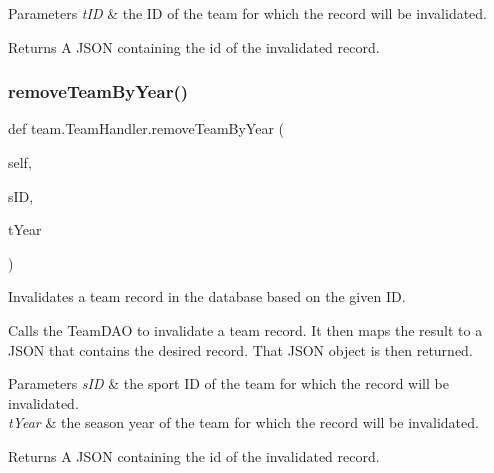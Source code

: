 \begin{DoxyParams}{Parameters}
{\em t\+ID} & the ID of the team for which the record will be invalidated.\\
\hline
\end{DoxyParams}
\begin{DoxyReturn}{Returns}
A J\+S\+ON containing the id of the invalidated record. 
\end{DoxyReturn}
\mbox{\label{classteam_1_1_team_handler_abf03ca844675d071f4afcbaaf098deb7}} 
\subsubsection{\texorpdfstring{remove\+Team\+By\+Year()}{removeTeamByYear()}}
{\footnotesize\ttfamily def team.\+Team\+Handler.\+remove\+Team\+By\+Year (\begin{DoxyParamCaption}\item[{}]{self,  }\item[{}]{s\+ID,  }\item[{}]{t\+Year }\end{DoxyParamCaption})}



Invalidates a team record in the database based on the given ID. 

Calls the Team\+D\+AO to invalidate a team record. It then maps the result to a J\+S\+ON that contains the desired record. That J\+S\+ON object is then returned.


\begin{DoxyParams}{Parameters}
{\em s\+ID} & the sport ID of the team for which the record will be invalidated. \\
\hline
{\em t\+Year} & the season year of the team for which the record will be invalidated.\\
\hline
\end{DoxyParams}
\begin{DoxyReturn}{Returns}
A J\+S\+ON containing the id of the invalidated record. 
\end{DoxyReturn}
\mbox{\label{classteam_1_1_team_handler_ac1bc3a20efbfd07fe3796fa5880b26ba}} 
